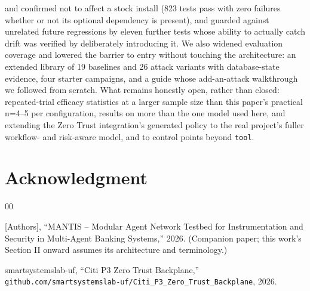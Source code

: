 \documentclass[conference]{IEEEtran}
\begin{document}
and confirmed not to affect a stock install (823 tests pass with zero failures whether or not its optional dependency is present), and guarded against unrelated future regressions by eleven further tests whose ability to actually catch drift was verified by deliberately introducing it. We also widened evaluation coverage and lowered the barrier to entry without touching the architecture: an extended library of 19 baselines and 26 attack variants with database-state evidence, four starter campaigns, and a guide whose add-an-attack walkthrough we followed from scratch. What remains honestly open, rather than closed: repeated-trial efficacy statistics at a larger sample size than this paper's practical n=4--5 per configuration, results on more than the one model used here, and extending the Zero Trust integration's generated policy to the real project's fuller workflow- and risk-aware model, and to control points beyond \texttt{tool}.

\section*{Acknowledgment}

\begin{thebibliography}{00}

[Authors], ``MANTIS -- Modular Agent Network Testbed for Instrumentation and Security in Multi-Agent Banking Systems,'' 2026. (Companion paper; this work's Section II onward assumes its architecture and terminology.)

smartsystemslab-uf, ``Citi P3 Zero Trust Backplane,'' \texttt{github.com/smartsystemslab-uf/Citi\_P3\_Zero\_Trust\_Backplane}, 2026.

\end{thebibliography}
\vspace{12pt}
\end{document}
